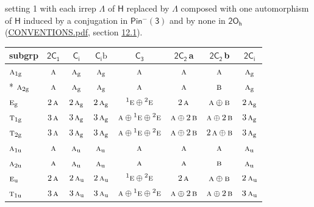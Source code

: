 \documentclass[10pt,a4paper]{article}
\numberwithin{equation}{section}
\newcommand{\grp}[1]{\mathsf{#1}}
\newcommand{\irr}[1]{\text{\normalfont\scshape #1}}
\newcommand{\conjpair}[1]{{}^{#1}}
\newcommand{\ptag}[1]{\mathrm{#1}}
\newcommand{\clsletter}[1]{\,{\scriptsize\color{black!55}#1}}
\newcommand{\secondclass}{\mathrm{b}}
\begin{document}
setting 1 with each irrep $\Lambda$ of $\grp{H}$ replaced by $\Lambda$ composed with one automorphism of $\grp{H}$ induced by a conjugation in \href{Pinminus3.pdf}{$\grp{Pin^{-}(3)}$} and by none in $\grp{2O_{h}}$ (\href{../../CONVENTIONS.pdf}{CONVENTIONS.pdf}, section \href{../../../rotation/CONVENTIONS.pdf\#conv.12.1}{12.1}).
{\small\begin{longtable}{@{}lccccccc@{}}\toprule
subgrp & \href{2C1.pdf}{$\grp{2C_{1}}$} & \href{S2.pdf}{$\grp{C_{i}}$} & \href{S2b.pdf}{$\grp{C_{i}}\secondclass$} & \href{C3.pdf}{$\grp{C_{3}}$} & \href{2C2.pdf}{$\grp{2C_{2}}$}\clsletter{a} & \href{2C2.pdf}{$\grp{2C_{2}}$}\clsletter{b} & \href{2S2.pdf}{$\grp{2C_{i}}$}\\\midrule\endhead
\bottomrule\endfoot\endlastfoot
$\irr{a}_{1\ptag{g}}$ & $\irr{a}$ & $\irr{a}_{\ptag{g}}$ & $\irr{a}_{\ptag{g}}$ & $\irr{a}$ & $\irr{a}$ & $\irr{a}$ & $\irr{a}_{\ptag{g}}$\\*
$\irr{a}_{2\ptag{g}}$ & $\irr{a}$ & $\irr{a}_{\ptag{g}}$ & $\irr{a}_{\ptag{g}}$ & $\irr{a}$ & $\irr{a}$ & $\irr{b}$ & $\irr{a}_{\ptag{g}}$\\
$\irr{e}_{\ptag{g}}$ & $2\,\irr{a}$ & $2\,\irr{a}_{\ptag{g}}$ & $2\,\irr{a}_{\ptag{g}}$ & $\conjpair{1}\irr{e}\oplus \conjpair{2}\irr{e}$ & $2\,\irr{a}$ & $\irr{a}\oplus \irr{b}$ & $2\,\irr{a}_{\ptag{g}}$\\
$\irr{t}_{1\ptag{g}}$ & $3\,\irr{a}$ & $3\,\irr{a}_{\ptag{g}}$ & $3\,\irr{a}_{\ptag{g}}$ & $\irr{a}\oplus \conjpair{1}\irr{e}\oplus \conjpair{2}\irr{e}$ & $\irr{a}\oplus 2\,\irr{b}$ & $\irr{a}\oplus 2\,\irr{b}$ & $3\,\irr{a}_{\ptag{g}}$\\
$\irr{t}_{2\ptag{g}}$ & $3\,\irr{a}$ & $3\,\irr{a}_{\ptag{g}}$ & $3\,\irr{a}_{\ptag{g}}$ & $\irr{a}\oplus \conjpair{1}\irr{e}\oplus \conjpair{2}\irr{e}$ & $\irr{a}\oplus 2\,\irr{b}$ & $2\,\irr{a}\oplus \irr{b}$ & $3\,\irr{a}_{\ptag{g}}$\\
$\irr{a}_{1\ptag{u}}$ & $\irr{a}$ & $\irr{a}_{\ptag{u}}$ & $\irr{a}_{\ptag{u}}$ & $\irr{a}$ & $\irr{a}$ & $\irr{a}$ & $\irr{a}_{\ptag{u}}$\\
$\irr{a}_{2\ptag{u}}$ & $\irr{a}$ & $\irr{a}_{\ptag{u}}$ & $\irr{a}_{\ptag{u}}$ & $\irr{a}$ & $\irr{a}$ & $\irr{b}$ & $\irr{a}_{\ptag{u}}$\\
$\irr{e}_{\ptag{u}}$ & $2\,\irr{a}$ & $2\,\irr{a}_{\ptag{u}}$ & $2\,\irr{a}_{\ptag{u}}$ & $\conjpair{1}\irr{e}\oplus \conjpair{2}\irr{e}$ & $2\,\irr{a}$ & $\irr{a}\oplus \irr{b}$ & $2\,\irr{a}_{\ptag{u}}$\\
$\irr{t}_{1\ptag{u}}$ & $3\,\irr{a}$ & $3\,\irr{a}_{\ptag{u}}$ & $3\,\irr{a}_{\ptag{u}}$ & $\irr{a}\oplus \conjpair{1}\irr{e}\oplus \conjpair{2}\irr{e}$ & $\irr{a}\oplus 2\,\irr{b}$ & $\irr{a}\oplus 2\,\irr{b}$ & $3\,\irr{a}_{\ptag{u}}$\\

\end{longtable}}
\end{document}
